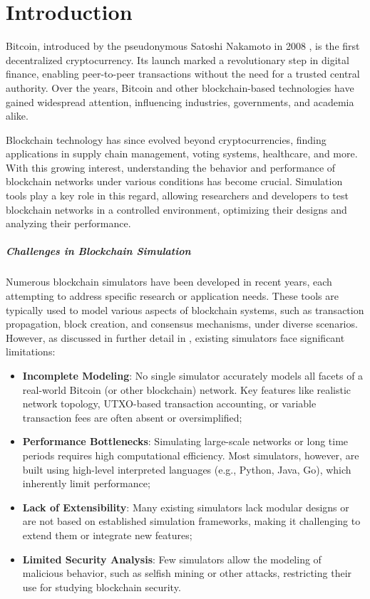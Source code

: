 \chapter{Introduction}\label{ch:intro}

Bitcoin, introduced by the pseudonymous Satoshi Nakamoto in 2008
\cite{whitepaper}, is the first decentralized cryptocurrency. Its launch marked
a revolutionary step in digital finance, enabling peer-to-peer transactions
without the need for a trusted central authority. Over the years, Bitcoin and
other blockchain-based technologies have gained widespread attention,
influencing industries, governments, and academia alike.

Blockchain technology has since evolved beyond cryptocurrencies, finding
applications in supply chain management, voting systems, healthcare, and more.
With this growing interest, understanding the behavior and performance of
blockchain networks under various conditions has become crucial. Simulation
tools play a key role in this regard, allowing researchers and developers to
test blockchain networks in a controlled environment, optimizing their designs
and analyzing their performance.

\paragraph{Challenges in Blockchain Simulation}\label{par:intro-challenges}

Numerous blockchain simulators have been developed in recent years, each
attempting to address specific research or application needs. These tools are
typically used to model various aspects of blockchain systems, such as
transaction propagation, block creation, and consensus mechanisms, under
diverse scenarios. However, as discussed in further detail in
, existing simulators face significant limitations:
\begin{itemize}
	\item \textbf{Incomplete Modeling}: No single simulator accurately
		models all facets of a real-world Bitcoin (or other blockchain)
		network. Key features like realistic network topology,
		UTXO-based transaction accounting, or variable transaction fees
		are often absent or oversimplified;
	\item \textbf{Performance Bottlenecks}: Simulating large-scale networks
		or long time periods requires high computational efficiency.
		Most simulators, however, are built using high-level
		interpreted languages (e.g., Python, Java, Go), which
		inherently limit performance;
	\item \textbf{Lack of Extensibility}: Many existing simulators lack
		modular designs or are not based on established simulation
		frameworks, making it challenging to extend them or integrate
		new features;
	\item \textbf{Limited Security Analysis}: Few simulators allow the
		modeling of malicious behavior, such as selfish mining or other
		attacks, restricting their use for studying blockchain
		security.
\end{itemize}

